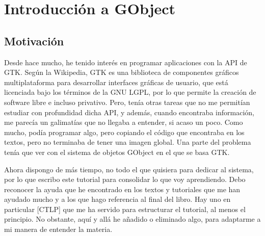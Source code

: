 %



\section{Introducción a \textsf{GObject}}

\subsection{Motivación} \label{subsec:motivacion}
Desde hace mucho, he tenido  interés en programar aplicaciones con la API de \textsf{GTK}.
Según la Wikipedia, \textsf{GTK} es una biblioteca de componentes gráficos multiplataforma para desarrollar
interfaces gráficas de usuario, que está licenciada bajo los términos de la GNU LGPL, por lo que permite la creación de software libre e incluso privativo.
Pero, tenía otras tareas que no me permitían estudiar con profundidad dicha API, y además, cuando encontraba información, me parecía un galimatías que no llegaba a entender, si acaso un poco.
Como mucho, podía programar algo, pero copiando el código que encontraba en los textos, pero no terminaba de tener una imagen global.
Una parte del problema tenía que ver con el sistema de objetos \textsf{GObject} en el que se basa \textsf{GTK}.

Ahora dispongo de más tiempo, no todo el que quisiera para dedicar al sistema, por lo que escribo este tutorial  para consolidar lo que voy aprendiendo.
Debo reconocer la ayuda que he encontrado en los textos y tutoriales que me han ayudado mucho y a los que hago referencia al final del libro. Hay uno en particular [CTLP] que me ha servido para estructurar el tutorial, al menos el principio. No obstante, aquí y allá he añadido o eliminado algo, para adaptarme a mi manera de entender la materia.

